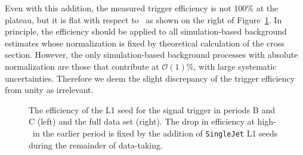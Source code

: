 Even with this addition, the measured trigger efficiency is not 100\% at the plateau, but it is flat with respect to \ET\ as shown on the right of Figure~\ref{fig:l1_eff}. 
In principle, the efficiency should be applied to all simulation-based background estimates whose normalization is fixed by theoretical calculation of the cross section.
However, the only simulation-based background processes with absolute normalization are those that contribute at $\mathcal{O}(1)$\%, with large systematic uncertainties. 
Therefore we deem the slight discrepancy of the trigger efficiency from unity as irrelevant.

\begin{figure}[htbp]
  \centering
  \caption{
    The efficiency of the L1 seed for the signal trigger in periods B and C (left) and the full data set (right). The drop in efficiency at high-\ET\ in the earlier period is fixed by the addition of \texttt{SingleJet} L1 seeds during the remainder of data-taking. 
  }
  \label{fig:l1_eff}
\end{figure}
